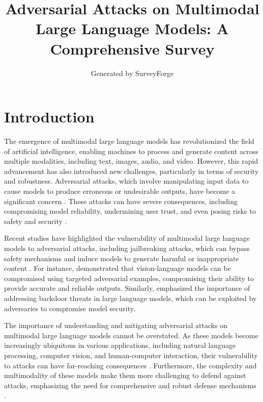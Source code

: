 \documentclass[11pt,a4paper]{article}
\title{Adversarial Attacks on Multimodal Large Language Models: A Comprehensive Survey}
\author{Generated by SurveyForge}
\date{}
\begin{document}
\maketitle
\tableofcontents
\newpage



\section{Introduction}


The emergence of multimodal large language models has revolutionized the field of artificial intelligence, enabling machines to process and generate content across multiple modalities, including text, images, audio, and video. However, this rapid advancement has also introduced new challenges, particularly in terms of security and robustness. Adversarial attacks, which involve manipulating input data to cause models to produce erroneous or undesirable outputs, have become a significant concern \cite{doi:10.1109/iccvw60793.2023.00395}. These attacks can have severe consequences, including compromising model reliability, undermining user trust, and even posing risks to safety and security \cite{arxiv:2402.02309}.

Recent studies have highlighted the vulnerability of multimodal large language models to adversarial attacks, including jailbreaking attacks, which can bypass safety mechanisms and induce models to generate harmful or inappropriate content \cite{doi:10.1609/aaai.v38i19.30150}. For instance, \cite{arxiv:2305.16934} demonstrated that vision-language models can be compromised using targeted adversarial examples, compromising their ability to provide accurate and reliable outputs. Similarly, \cite{doi:10.53941/tai.2025.100003} emphasized the importance of addressing backdoor threats in large language models, which can be exploited by adversaries to compromise model security.

The importance of understanding and mitigating adversarial attacks on multimodal large language models cannot be overstated. As these models become increasingly ubiquitous in various applications, including natural language processing, computer vision, and human-computer interaction, their vulnerability to attacks can have far-reaching consequences \cite{arxiv:2402.00891}. Furthermore, the complexity and multimodality of these models make them more challenging to defend against attacks, emphasizing the need for comprehensive and robust defense mechanisms \cite{arxiv:2401.13601}.
\end{document}

